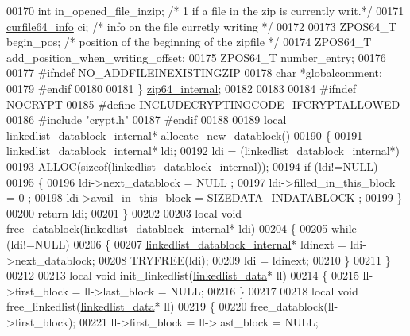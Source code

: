 \begin{DoxyCode}
00170     \textcolor{keywordtype}{int}  in\_opened\_file\_inzip;  \textcolor{comment}{/* 1 if a file in the zip is currently writ.*/}
00171     \hyperlink{structcurfile64__info}{curfile64\_info} ci;            \textcolor{comment}{/* info on the file curretly writing */}
00172 
00173     ZPOS64\_T begin\_pos;            \textcolor{comment}{/* position of the beginning of the zipfile */}
00174     ZPOS64\_T add\_position\_when\_writing\_offset;
00175     ZPOS64\_T number\_entry;
00176 
00177 \textcolor{preprocessor}{#ifndef NO\_ADDFILEINEXISTINGZIP}
00178     \textcolor{keywordtype}{char} *globalcomment;
00179 \textcolor{preprocessor}{#endif}
00180 
00181 \} \hyperlink{structzip64__internal}{zip64\_internal};
00182 
00183 
00184 \textcolor{preprocessor}{#ifndef NOCRYPT}
00185 \textcolor{preprocessor}{#define INCLUDECRYPTINGCODE\_IFCRYPTALLOWED}
00186 \textcolor{preprocessor}{#include "crypt.h"}
00187 \textcolor{preprocessor}{#endif}
00188 
00189 local \hyperlink{structlinkedlist__datablock__internal__s}{linkedlist\_datablock\_internal}* allocate\_new\_datablock()
00190 \{
00191     \hyperlink{structlinkedlist__datablock__internal__s}{linkedlist\_datablock\_internal}* ldi;
00192     ldi = (\hyperlink{structlinkedlist__datablock__internal__s}{linkedlist\_datablock\_internal}*)
00193                  ALLOC(\textcolor{keyword}{sizeof}(\hyperlink{structlinkedlist__datablock__internal__s}{linkedlist\_datablock\_internal}));
00194     \textcolor{keywordflow}{if} (ldi!=NULL)
00195     \{
00196         ldi->next\_datablock = NULL ;
00197         ldi->filled\_in\_this\_block = 0 ;
00198         ldi->avail\_in\_this\_block = SIZEDATA\_INDATABLOCK ;
00199     \}
00200     \textcolor{keywordflow}{return} ldi;
00201 \}
00202 
00203 local \textcolor{keywordtype}{void} free\_datablock(\hyperlink{structlinkedlist__datablock__internal__s}{linkedlist\_datablock\_internal}* ldi)
00204 \{
00205     \textcolor{keywordflow}{while} (ldi!=NULL)
00206     \{
00207         \hyperlink{structlinkedlist__datablock__internal__s}{linkedlist\_datablock\_internal}* ldinext = ldi->next\_datablock;
00208         TRYFREE(ldi);
00209         ldi = ldinext;
00210     \}
00211 \}
00212 
00213 local \textcolor{keywordtype}{void} init\_linkedlist(\hyperlink{structlinkedlist__data__s}{linkedlist\_data}* ll)
00214 \{
00215     ll->first\_block = ll->last\_block = NULL;
00216 \}
00217 
00218 local \textcolor{keywordtype}{void} free\_linkedlist(\hyperlink{structlinkedlist__data__s}{linkedlist\_data}* ll)
00219 \{
00220     free\_datablock(ll->first\_block);
00221     ll->first\_block = ll->last\_block = NULL;

\end{DoxyCode}
